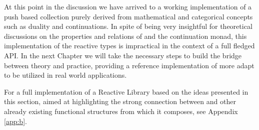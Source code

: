At this point in the discussion we have arrived to a working implementation of a push based collection purely derived from mathematical and categorical concepts such as duality and continuations. In spite of being very insightful for theoretical discussions on the properties and relations of  and the continuation monad, this implementation of the reactive types is impractical in the context of a full fledged API. In the next Chapter we will take the necessary steps to build the bridge between theory and practice, providing a reference implementation of  more adapt to be utilized in real world applications.

For a full implementation of a Reactive Library based on the ideas presented in this section, aimed at highlighting the strong connection between  and other already existing functional structures from which it composes, see Appendix \ref{app:b}. 
